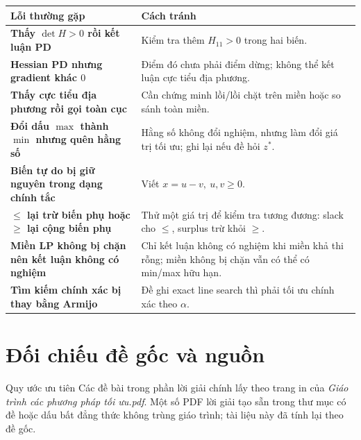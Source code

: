 \documentclass[11pt,a4paper]{article}
\begin{document}
\begin{center}
\begin{tabularx}{.96\textwidth}{>{\bfseries}p{}Y}
\toprule
Lỗi thường gặp & Cách tránh\\
\midrule
Thấy \(\det H>0\) rồi kết luận PD & Kiểm tra thêm \(H_{11}>0\) trong hai biến.\\
Hessian PD nhưng gradient khác \(0\) & Điểm đó chưa phải điểm dừng; không thể kết luận cực tiểu địa phương.\\
Thấy cực tiểu địa phương rồi gọi toàn cục & Cần chứng minh lồi/lồi chặt trên miền hoặc so sánh toàn miền.\\
Đổi dấu \(\max\) thành \(\min\) nhưng quên hằng số & Hằng số không đổi nghiệm, nhưng làm đổi giá trị tối ưu; ghi lại nếu đề hỏi \(z^\ast\).\\
Biến tự do bị giữ nguyên trong dạng chính tắc & Viết \(x=u-v,\ u,v\ge0\).\\
\(\le\) lại trừ biến phụ hoặc \(\ge\) lại cộng biến phụ & Thử một giá trị để kiểm tra tương đương: slack cho \(\le\), surplus trừ khỏi \(\ge\).\\
Miền LP không bị chặn nên kết luận không có nghiệm & Chỉ kết luận không có nghiệm khi miền khả thi rỗng; miền không bị chặn vẫn có thể có min/max hữu hạn.\\
Tìm kiếm chính xác bị thay bằng Armijo & Đề ghi exact line search thì phải tối ưu chính xác theo \(\alpha\).\\
\bottomrule
\end{tabularx}
\end{center}

\section{Đối chiếu đề gốc và nguồn}
\begin{keybox}{Quy ước ưu tiên}
Các đề bài trong phần lời giải chính lấy theo trang in của \textit{Giáo trình các phương pháp tối ưu.pdf}. Một số PDF lời giải tạo sẵn trong thư mục có đề hoặc dấu bất đẳng thức không trùng giáo trình; tài liệu này đã tính lại theo đề gốc.
\end{keybox}
\end{document}
